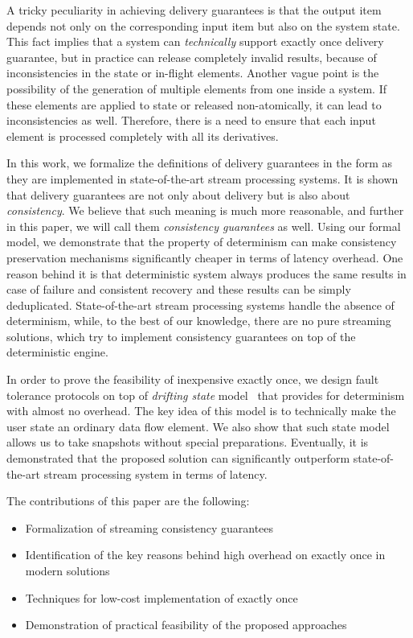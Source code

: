 A tricky peculiarity in achieving delivery guarantees is that the output item depends not only on the corresponding input item but also on the system state. This fact implies that a system can {\em technically} support exactly once delivery guarantee, but in practice can release completely invalid results, because of inconsistencies in the state or in-flight elements. Another vague point is the possibility of the generation of multiple elements from one inside a system. If these elements are applied to state or released non-atomically, it can lead to inconsistencies as well. Therefore, there is a need to ensure that each input element is processed completely with all its derivatives. 

In this work, we formalize the definitions of delivery guarantees in the form as they are implemented in state-of-the-art stream processing systems. It is shown that delivery guarantees are not only about delivery but is also about {\em consistency}. We believe that such meaning is much more reasonable, and further in this paper, we will call them {\em consistency guarantees} as well. Using our formal model, we demonstrate that the property of determinism can make consistency preservation mechanisms significantly cheaper in terms of latency overhead. One reason behind it is that deterministic system always produces the same results in case of failure and consistent recovery and these results can be simply deduplicated. State-of-the-art stream processing systems handle the absence of determinism, while, to the best of our knowledge, there are no pure streaming solutions, which try to implement consistency guarantees on top of the deterministic engine.

In order to prove the feasibility of inexpensive exactly once, we design fault tolerance protocols on top of {\em drifting state} model~\cite{we2018adbis} that provides for determinism with almost no overhead. The key idea of this model is to technically make the user state an ordinary data flow element. We also show that such state model allows us to take snapshots without special preparations. Eventually, it is demonstrated that the proposed solution can significantly outperform state-of-the-art stream processing system in terms of latency.

The contributions of this paper are the following: 
\begin{itemize}
    \item Formalization of streaming consistency guarantees 
    \item Identification of the key reasons behind high overhead on exactly once in modern solutions 
    \item Techniques for low-cost implementation of exactly once
    \item Demonstration of practical feasibility of the proposed approaches
\end{itemize}

